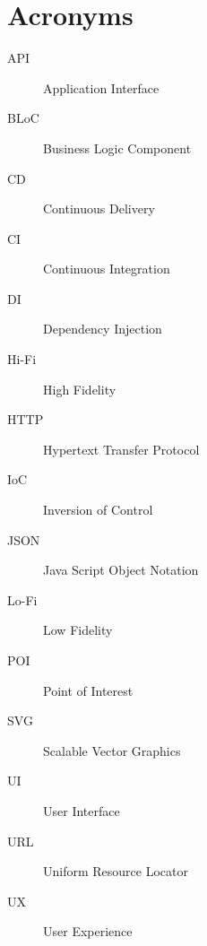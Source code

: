\chapter{Acronyms}\label{ch:acronyms}
\begin{description}
	\item[API] Application Interface
	\item[BLoC] Business Logic Component
	\item[CD] Continuous Delivery
	\item[CI] Continuous Integration
	\item[DI] Dependency Injection
	\item[Hi-Fi] High Fidelity
	\item[HTTP] Hypertext Transfer Protocol
	\item[IoC] Inversion of Control
	\item[JSON] Java Script Object Notation
	\item[Lo-Fi] Low Fidelity
	\item[POI] Point of Interest
	\item[SVG] Scalable Vector Graphics
	\item[UI] User Interface
	\item[URL] Uniform Resource Locator
	\item[UX] User Experience
\end{description}
